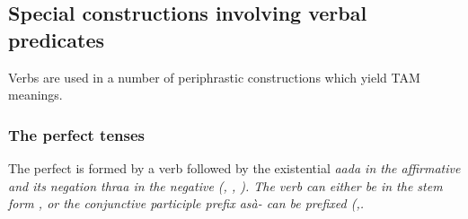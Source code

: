 

% 



% 
% 
% 




\subsection{Special constructions involving verbal predicates}\label{sec:wc:Specialconstructionsinvolvingverbalpredicates}
Verbs are used in a number of periphrastic constructions which yield TAM meanings.

\subsubsection{The perfect tenses}\label{sec:wc:Theperfecttenses}
The perfect is formed by a verb followed by the existential \em aada \em in the affirmative and its negation \em thraa \em in the negative (\citet[cf.][143]{Slomanson2007cll}, \citet[169f]{SmithEtAl2007}, \citet{Ansaldo2009}). The verb can either be in the stem form , or the conjunctive participle prefix \em asà- \em can be prefixed (\citet[143]{Slomanson2007cll},\citet[]{Slomanson2008lingua}.



